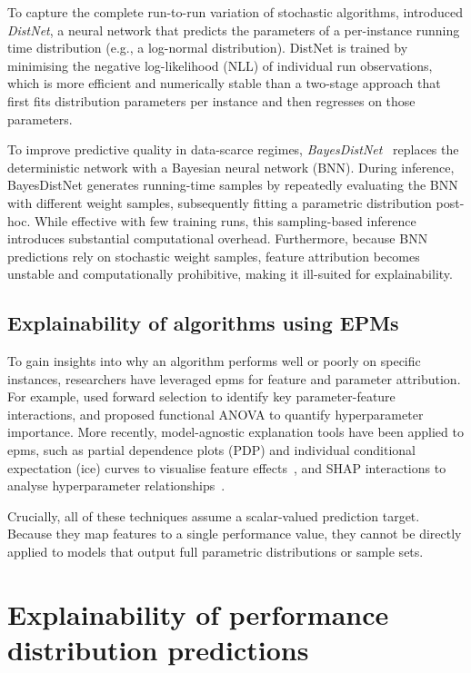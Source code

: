 To capture the complete run-to-run variation of stochastic algorithms, \citet{EggEtAl18} introduced \emph{DistNet}, a neural network that predicts the parameters of a per-instance running time distribution (e.g., a log-normal distribution). DistNet is trained by minimising the negative log-likelihood (NLL) of individual run observations, which is more efficient and numerically stable than a two-stage approach that first fits distribution parameters per instance and then regresses on those parameters.

To improve predictive quality in data-scarce regimes, \emph{BayesDistNet}~\citep{TueBur21} replaces the deterministic network with a Bayesian neural network (BNN). During inference, BayesDistNet generates running-time samples by repeatedly evaluating the BNN with different weight samples, subsequently fitting a parametric distribution post-hoc. While effective with few training runs, this sampling-based inference introduces substantial computational overhead. Furthermore, because BNN predictions rely on stochastic weight samples, feature attribution becomes unstable and computationally prohibitive, making it ill-suited for explainability.

\subsection{Explainability of algorithms using EPMs}
To gain insights into why an algorithm performs well or poorly on specific instances, researchers have leveraged \glspl{epm} for feature and parameter attribution. For example, \citet{HutEtAl13} used forward selection to identify key parameter-feature interactions, and \citet{HutEtAl14a} proposed functional ANOVA to quantify hyperparameter importance. More recently, model-agnostic explanation tools have been applied to \glspl{epm}, such as partial dependence plots (PDP) and individual conditional expectation (\gls{ice}) curves to visualise feature effects~\citep{MooEtAl21}, and SHAP interactions to analyse hyperparameter relationships~\citep{WevEtAl25}.

Crucially, all of these techniques assume a scalar-valued prediction target. Because they map features to a single performance value, they cannot be directly applied to models that output full parametric distributions or sample sets.

\section{Explainability of performance distribution predictions}
\label{sec:explainability}


